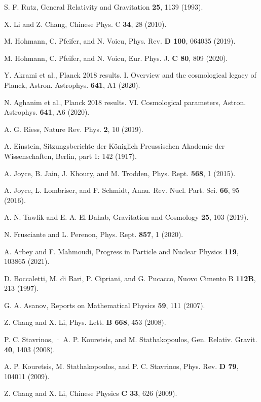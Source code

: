\documentclass[aps,superscriptaddress, showpacs,preprintnumbers, superscriptaddress, nofootinbibt,twocolumn]{revtex4-2}
\begin{document}
\begin{thebibliography}{99}
 S. F. Rutz, General Relativity and Gravitation {\bf  25}, 1139 (1993).

 X. Li and Z. Chang, Chinese Phys. C {\bf 34}, 28 (2010).

 M. Hohmann, C. Pfeifer, and N. Voicu, Phys. Rev. {\bf D 100}, 064035 (2019).

 M. Hohmann, C. Pfeifer, and N. Voicu, Eur. Phys. J. {\bf C 80}, 809 (2020).

 Y. Akrami et al., Planck 2018 results. I. Overview and the
cosmological legacy of Planck, Astron. Astrophys. {\bf 641}, A1 (2020).

 N. Aghanim et al., Planck 2018 results. VI. Cosmological
parameters, Astron. Astrophys. {\bf 641}, A6 (2020).

 A. G. Riess, Nature Rev. Phys. \textbf{2}, 10 (2019).

 A. Einstein, Sitzungsberichte der K\"{o}niglich Preussischen Akademie der Wissenschaften, Berlin,  part 1: 142 (1917).

 A. Joyce, B. Jain, J. Khoury, and M. Trodden,  Phys. Rept. {\bf 568},  1 (2015).

 A. Joyce, L. Lombriser, and F. Schmidt, Annu. Rev. Nucl. Part. Sci. {\bf 66}, 95 (2016).

 A. N. Tawfik and E. A. El Dahab, Gravitation and Cosmology {\bf  25}, 103 (2019).

 N. Frusciante and L. Perenon, Phys. Rept. {\bf 857},  1 (2020).

 A. Arbey and F. Mahmoudi, Progress in Particle and Nuclear Physics {\bf 119}, 103865 (2021).

 D. Boccaletti, M. di Bari, P. Cipriani, and G. Pucacco, Nuovo Cimento B {\bf 112B},  213 (1997).

 G. A. Asanov, Reports on Mathematical Physics {\bf 59},  111 (2007).

 Z. Chang and X. Li, Phys. Lett. {\bf B 668}, 453 (2008).

 P. C. Stavrinos, · A. P. Kouretsis, and M. Stathakopoulos, Gen. Relativ. Gravit. {\bf 40}, 1403 (2008).

 A. P. Kouretsis, M. Stathakopoulos, and P. C. Stavrinos, Phys. Rev. {\bf D 79}, 104011 (2009).

 Z. Chang and X. Li, Chinese Physics {\bf C 33},  626 (2009).


\end{thebibliography}
\end{document}
